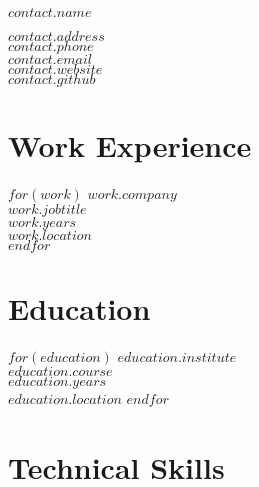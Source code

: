 \documentclass{cv-class}
\begin{document}
{\Large $contact.name$}\\
\smallskip

$contact.address$\\
$contact.phone$\\
$contact.email$\\
$contact.website$\\
$contact.github$

\section*{Work Experience}
$for(work)$
$work.company$\\
$work.jobtitle$\\
$work.years$\\
$work.location$\\
$endfor$

\section*{Education}
$for(education)$
$education.institute$\\
$education.course$\\
$education.years$\\
$education.location$
$endfor$

\section*{Technical Skills}
\end{document}
